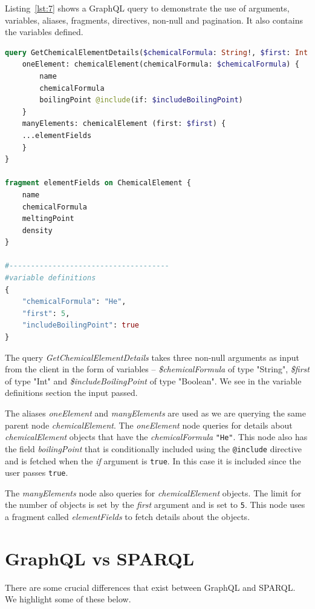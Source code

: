 Listing~\ref{lst:7} shows a GraphQL query to demonstrate the use of arguments, variables, aliases, fragments, directives, non-null and pagination. It also contains the variables defined.

\begin{minipage}{\linewidth}
\begin{lstlisting}[columns=fullflexible, label=lst:7, caption={GraphQL query demonstrating some useful features}, language=GraphQL]
query GetChemicalElementDetails($chemicalFormula: String!, $first: Int!, $includeBoilingPoint: Boolean!) {
	oneElement: chemicalElement(chemicalFormula: $chemicalFormula) {
		name
		chemicalFormula
		boilingPoint @include(if: $includeBoilingPoint) 
	}
	manyElements: chemicalElement (first: $first) {
	...elementFields
	}
}

fragment elementFields on ChemicalElement {
	name
	chemicalFormula
	meltingPoint
	density
}

#-------------------------------------
#variable definitions
{
	"chemicalFormula": "He",
	"first": 5, 
	"includeBoilingPoint": true
}
\end{lstlisting}
\end{minipage}

The query \textit{GetChemicalElementDetails} takes three non-null arguments as input from the client in the form of variables – \textit{\$chemicalFormula} of type "String", \textit{\$first} of type "Int" and \textit{\$includeBoilingPoint} of type "Boolean". We see in the variable definitions section the input passed.

The aliases \textit{oneElement} and \textit{manyElements} are used as we are querying the same parent node \textit{chemicalElement}. The \textit{oneElement} node queries for details about \textit{chemicalElement} objects that have the \textit{chemicalFormula} \texttt{"He"}. This node also has the field \textit{boilingPoint} that is conditionally included using the \texttt{@include} directive and is fetched when the \textit{if} argument is \texttt{true}. In this case it is included since the user passes \texttt{true}. 

The \textit{manyElements} node also queries for \textit{chemicalElement} objects. The limit for the number of objects is set by the \textit{first} argument and is set to \texttt{5}. This node uses a fragment called \textit{elementFields} to fetch details about the objects.


\section{GraphQL vs SPARQL}
There are some crucial differences that exist between GraphQL and SPARQL. We highlight some of these below.


